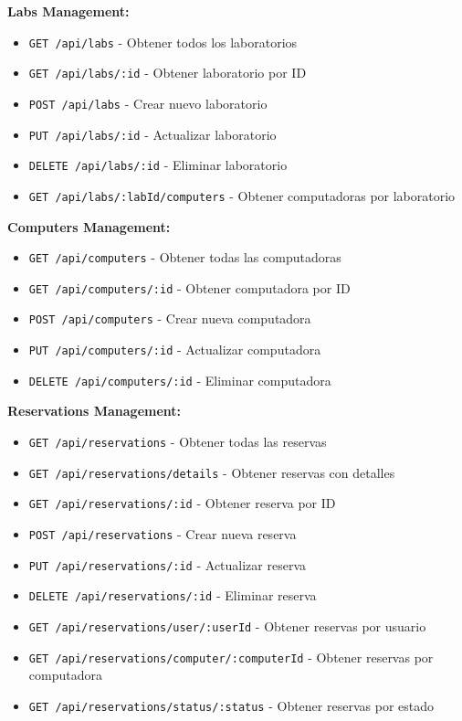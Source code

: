 \documentclass[12pt,a4paper]{article}
\begin{document}
\textbf{Labs Management:}
\begin{itemize}
    \item \texttt{GET /api/labs} - Obtener todos los laboratorios
    \item \texttt{GET /api/labs/:id} - Obtener laboratorio por ID
    \item \texttt{POST /api/labs} - Crear nuevo laboratorio
    \item \texttt{PUT /api/labs/:id} - Actualizar laboratorio
    \item \texttt{DELETE /api/labs/:id} - Eliminar laboratorio
    \item \texttt{GET /api/labs/:labId/computers} - Obtener computadoras por laboratorio
\end{itemize}

\textbf{Computers Management:}
\begin{itemize}
    \item \texttt{GET /api/computers} - Obtener todas las computadoras
    \item \texttt{GET /api/computers/:id} - Obtener computadora por ID
    \item \texttt{POST /api/computers} - Crear nueva computadora
    \item \texttt{PUT /api/computers/:id} - Actualizar computadora
    \item \texttt{DELETE /api/computers/:id} - Eliminar computadora
\end{itemize}

\textbf{Reservations Management:}
\begin{itemize}
    \item \texttt{GET /api/reservations} - Obtener todas las reservas
    \item \texttt{GET /api/reservations/details} - Obtener reservas con detalles
    \item \texttt{GET /api/reservations/:id} - Obtener reserva por ID
    \item \texttt{POST /api/reservations} - Crear nueva reserva
    \item \texttt{PUT /api/reservations/:id} - Actualizar reserva
    \item \texttt{DELETE /api/reservations/:id} - Eliminar reserva
    \item \texttt{GET /api/reservations/user/:userId} - Obtener reservas por usuario
    \item \texttt{GET /api/reservations/computer/:computerId} - Obtener reservas por computadora
    \item \texttt{GET /api/reservations/status/:status} - Obtener reservas por estado
\end{itemize}
\end{document}
